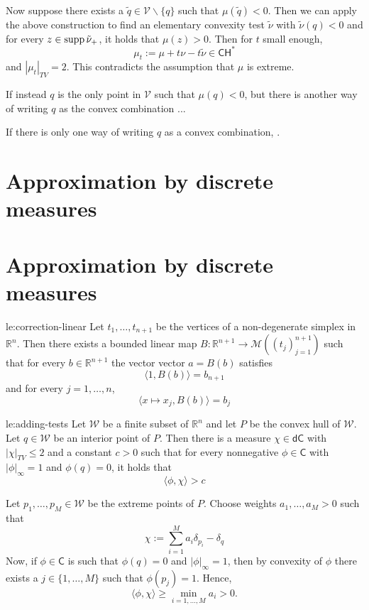 \documentclass[12pt]{amsart}
\let\Section=\section
\renewcommand{\section}[2][empty]{%
  \xdef\SubsectionName{}%
  \ifthenelse{\equal{#1}{empty}}%
               {\xdef\SectionName{#2}%
                \Section{#2}}%
               {\xdef\SectionName{#1}%
                \Section[#1]{#2}}%
}
\begin{document}
\begin{Proof}
	Now suppose there exists a $\tilde{q} \in \mathcal{V} \backslash \{ q \}$ such that $\mu(\tilde{q}) < 0$. Then we can apply the above construction to find an elementary convexity test $\tilde{\nu}$ with $\tilde{\nu}(q) < 0$ and for every $z \in \operatorname{\mathrm{supp}} \tilde{\nu}_+$, it holds that $\mu(z) > 0$. Then for $t$ small enough, 
	\[
	\mu_t := \mu + t \nu - t \tilde{\nu} \in \mathsf{CH}^* 
	\]
	and $|\mu_t|_{TV} = 2$. This contradicts the assumption that $\mu$ is extreme.
	
	If instead $q$ is the only point in $\mathcal{V}$ such that $\mu(q) < 0$, but there is another way of writing $q$ as the convex combination ... 
	
	If there is only one way of writing $q$ as a convex combination, .
\end{Proof}

\section{Approximation by discrete measures}

\begin{lemma}{le:correction-linear}
	Let $t_1, \dots, t_{n+1}$ be the vertices of a non-degenerate simplex in $\mathbb{R}^n$. 
	Then there exists a bounded linear map $B: \mathbb{R}^{n+1} \to  \mathcal{M}((t_j)_{j=1}^{n+1})$ such that for every $b \in \mathbb{R}^{n+1}$ the vector vector $a = B(b)$ satisfies
	\[
	\langle 1, B(b) \rangle = b_{n+1}
	\]
	and for every $j =1 , \dots, n$,
	\[
	\langle x \mapsto x_j, B(b) \rangle = b_j
	\]
\end{lemma}

\begin{lemma}{le:adding-tests}
Let $\mathcal{W}$ be a finite subset of $\mathbb{R}^n$ and let $P$ be the convex hull of $\mathcal{W}$. Let $q \in \mathcal{W}$ be an interior point of $P$. Then there is a measure $\chi \in \mathsf{dC}$ with $|\chi|_{TV} \leq 2$ and a constant $c > 0$ such that for every nonnegative $\phi \in \mathsf{C}$ with $|\phi|_\infty = 1$ and $\phi(q) = 0$, it holds that
\[
\langle \phi , \chi \rangle > c
\]
\end{lemma}

\begin{Proof}
Let $p_1, \dots, p_M \in \mathcal{W}$ be the extreme points of $P$. 
Choose weights $a_1, \dots, a_M > 0$ such that
\[
\chi := \sum_{i=1}^M a_i \delta_{p_i}- \delta_q
\]
Now, if $\phi \in \mathsf{C}$ is such that $\phi(q) = 0$ and $|\phi|_\infty = 1$, then by convexity of $\phi$ there exists a $j \in \{1, \dots, M\}$ such that $\phi(p_j) = 1$. Hence,
\[
\langle \phi , \chi \rangle \geq \min_{i  =1 , \dots, M } a_i > 0.
\]
\end{Proof}
\end{document}
